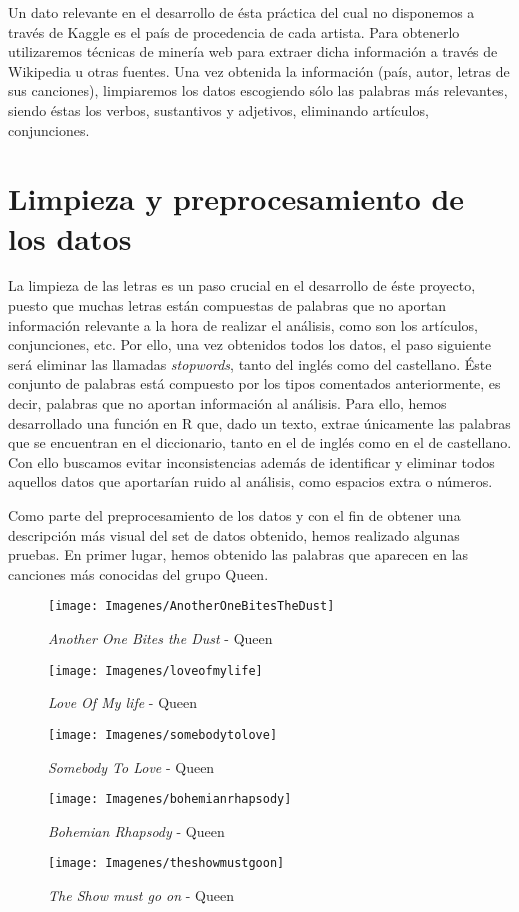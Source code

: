 Un dato relevante en el desarrollo de ésta práctica del cual no disponemos a través de Kaggle es el país de procedencia de cada artista. Para obtenerlo utilizaremos técnicas de minería web para extraer dicha información a través de Wikipedia u otras fuentes. Una vez obtenida la información (país, autor, letras de sus canciones), limpiaremos los datos escogiendo sólo las palabras más relevantes, siendo éstas los verbos, sustantivos y adjetivos, eliminando artículos, conjunciones.

\section{Limpieza y preprocesamiento de los datos}
La limpieza de las letras es un paso crucial en el desarrollo de éste proyecto, puesto que muchas letras están compuestas de palabras que no aportan información relevante a la hora de realizar el análisis, como son los artículos, conjunciones, etc. Por ello, una vez obtenidos todos los datos, el paso siguiente será eliminar las llamadas \textit{stopwords}, tanto del inglés como del castellano. Éste conjunto de palabras está compuesto por los tipos comentados anteriormente, es decir, palabras que no aportan información al análisis. Para ello, hemos desarrollado una función en R que, dado un texto, extrae únicamente las palabras que se encuentran en el diccionario, tanto en el de inglés como en el de castellano. Con ello buscamos evitar inconsistencias además de identificar y eliminar todos aquellos datos que aportarían ruido al análisis, como espacios extra o números.

Como parte del preprocesamiento de los datos y con el fin de obtener una descripción más visual del set de datos obtenido, hemos realizado algunas pruebas. En primer lugar, hemos obtenido las palabras que aparecen en las canciones más conocidas del grupo Queen.
\begin{figure}[h]
	\centering
	\texttt{[image: Imagenes/AnotherOneBitesTheDust]}
	\caption{\textit{Another One Bites the Dust} - Queen}
	\label{fig:AnotherOneBitesTheDust}
\end{figure}
\begin{figure}[h]
	\centering
	\texttt{[image: Imagenes/loveofmylife]}
	\caption{\textit{Love Of My life} - Queen}
	\label{fig:loveofmylife}
\end{figure}
\begin{figure}[h]
	\centering
	\texttt{[image: Imagenes/somebodytolove]}
	\caption{\textit{Somebody To Love} - Queen}
	\label{fig:sbtl}	
\end{figure}
\begin{figure}[h]
	\centering
	\texttt{[image: Imagenes/bohemianrhapsody]}
	\caption{\textit{Bohemian Rhapsody} - Queen}
	\label{fig:bohemianrhapsody}
\end{figure}
\begin{figure}[h]
	\centering
	\texttt{[image: Imagenes/theshowmustgoon]}
	\caption{\textit{The Show must go on} - Queen}
	\label{fig:tsmgo}
\end{figure}

